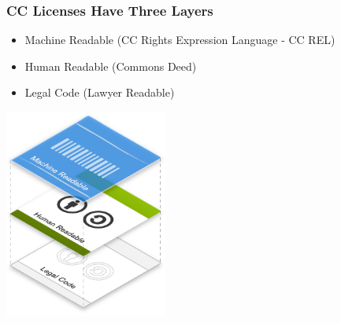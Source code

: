 \documentclass[mathserif,xcolor=dvipsnames,handout]{beamer}
\begin{document}
    \begin{frame}[t]
        \frametitle{CC Licenses Have Three Layers}
            \begin{itemize}
                \item<2-> Machine Readable (CC Rights Expression Language - CC REL)
                \item<3-> Human Readable (Commons Deed)
                \item<4-> Legal Code (Lawyer Readable)
            \end{itemize}
        \begin{center}
          \includegraphics[width=0.4\textwidth]{license_layers.png}
        \end{center}
    \end{frame}
\end{document}

